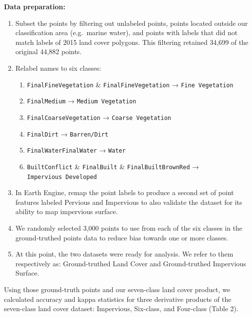 \documentclass[
]{report}
\providecommand{\tightlist}{%
  \setlength{\itemsep}{0pt}\setlength{\parskip}{0pt}}
\begin{document}
\textbf{Data preparation:}

\begin{enumerate}
\def\labelenumi{\arabic{enumi}.}
\item
  Subset the points by filtering out unlabeled points, points located outside our classification area (e.g.~marine water), and points with labels that did not match labels of 2015 land cover polygons. This filtering retained 34,699 of the original 44,882 points.
\item
  Relabel names to six classes:

  \begin{enumerate}
  \def\labelenumii{\arabic{enumii}.}
  \tightlist
  \item
    \texttt{FinalFineVegetation} \& \texttt{FinalFineVegetation} → \texttt{Fine\ Vegetation}
  \item
    \texttt{FinalMedium} → \texttt{Medium\ Vegetation}
  \item
    \texttt{FinalCoarseVegetation} → \texttt{Coarse\ Vegetation}
  \item
    \texttt{FinalDirt} → \texttt{Barren/Dirt}
  \item
    \texttt{FinalWaterFinalWater} → \texttt{Water}
  \item
    \texttt{BuiltConflict} \& \texttt{FinalBuilt} \& \texttt{FinalBuiltBrownRed} → \texttt{Impervious\ Developed}
  \end{enumerate}
\item
  In Earth Engine, remap the point labels to produce a second set of point features labeled Pervious and Impervious to also validate the dataset for its ability to map impervious surface.
\item
  We randomly selected 3,000 points to use from each of the six classes in the ground-truthed points data to reduce bias towards one or more classes.
\item
  At this point, the two datasets were ready for analysis. We refer to them respectively as: Ground-truthed Land Cover and Ground-truthed Impervious Surface.
\end{enumerate}

Using those ground-truth points and our seven-class land cover product, we calculated accuracy and kappa statistics for three derivative products of the seven-class land cover dataset: Impervious, Six-class, and Four-class (Table 2).
\end{document}
